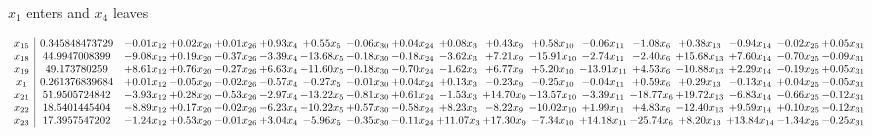 \documentclass[9pt]{article}
\begin{document}
 $ x_{1} $ enters and $ x_{4} $ leaves 

 \[\begin{array}{c| c c@{\hskip 2pt} c@{\hskip 2pt} c@{\hskip 2pt} c@{\hskip 2pt} c@{\hskip 2pt} c@{\hskip 2pt} c@{\hskip 2pt} c@{\hskip 2pt} c@{\hskip 2pt} c@{\hskip 2pt} c@{\hskip 2pt} c@{\hskip 2pt} c@{\hskip 2pt} c@{\hskip 2pt} c@{\hskip 2pt} c@{\hskip 2pt} }
 x_{15}   &  0.345848473729 & -0.01 x_{12} & +  0.02 x_{20} & +  0.01 x_{26} & +  0.93 x_{4} & +  0.55 x_{5} & -0.06 x_{30} & +  0.04 x_{24} & +  0.08 x_{3} & +  0.43 x_{9} & +  0.58 x_{10} & -0.06 x_{11} & -1.08 x_{6} & +  0.38 x_{13} & -0.94 x_{14} & -0.02 x_{25} & +  0.05 x_{31}\\
 x_{18}   &  44.9947008399 & -9.08 x_{12} & +  0.19 x_{20} & -0.37 x_{26} & -3.39 x_{4} & -13.68 x_{5} & -0.18 x_{30} & -0.18 x_{24} & -3.62 x_{3} & +  7.21 x_{9} & -15.91 x_{10} & -2.74 x_{11} & -2.40 x_{6} & + 15.68 x_{13} & +  7.60 x_{14} & -0.70 x_{25} & -0.09 x_{31}\\
 x_{19}   &  49.173780259 & +  8.61 x_{12} & +  0.76 x_{20} & -0.27 x_{26} & +  6.63 x_{4} & -11.60 x_{5} & -0.18 x_{30} & -0.70 x_{24} & -1.62 x_{3} & +  6.77 x_{9} & +  5.20 x_{10} & -13.91 x_{11} & +  4.53 x_{6} & -10.88 x_{13} & +  2.29 x_{14} & -0.19 x_{25} & +  0.05 x_{31}\\
 x_{1}   &  0.261376839684 & +  0.01 x_{12} & -0.05 x_{20} & -0.02 x_{26} & -0.57 x_{4} & -0.27 x_{5} & -0.01 x_{30} & +  0.04 x_{24} & +  0.13 x_{3} & -0.23 x_{9} & -0.25 x_{10} & -0.04 x_{11} & +  0.59 x_{6} & +  0.29 x_{13} & -0.13 x_{14} & +  0.04 x_{25} & -0.05 x_{31}\\
 x_{21}   &  51.9505724842 & -3.93 x_{12} & +  0.28 x_{20} & -0.53 x_{26} & -2.97 x_{4} & -13.22 x_{5} & -0.81 x_{30} & +  0.61 x_{24} & -1.53 x_{3} & + 14.70 x_{9} & -13.57 x_{10} & -3.39 x_{11} & -18.77 x_{6} & + 19.72 x_{13} & -6.83 x_{14} & -0.66 x_{25} & -0.12 x_{31}\\
 x_{22}   &  18.5401445404 & -8.89 x_{12} & +  0.17 x_{20} & -0.02 x_{26} & -6.23 x_{4} & -10.22 x_{5} & +  0.57 x_{30} & -0.58 x_{24} & +  8.23 x_{3} & -8.22 x_{9} & -10.02 x_{10} & +  1.99 x_{11} & +  4.83 x_{6} & -12.40 x_{13} & +  9.59 x_{14} & +  0.10 x_{25} & -0.12 x_{31}\\
 x_{23}   &  17.3957547202 & -1.24 x_{12} & +  0.53 x_{20} & -0.01 x_{26} & +  3.04 x_{4} & -5.96 x_{5} & -0.35 x_{30} & -0.11 x_{24} & + 11.07 x_{3} & + 17.30 x_{9} & -7.34 x_{10} & + 14.18 x_{11} & -25.74 x_{6} & +  8.20 x_{13} & + 13.84 x_{14} & -1.34 x_{25} & -0.25 x_{31}\\

\end{array}\]
\end{document}
